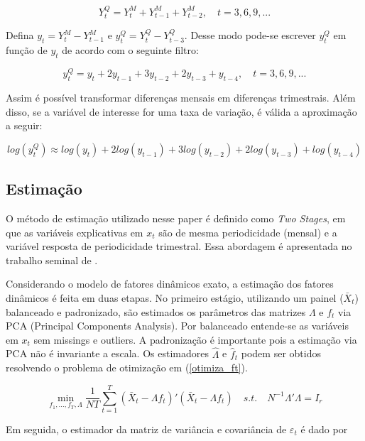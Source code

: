 \documentclass{article}
\begin{document}
\begin{equation}
Y_t^Q = Y_t^M + Y_{t-1}^M + Y_{t-2}^M, \quad  t = 3,6,9,...
\end{equation}

Defina $y_t = Y_t^M - Y_{t-1}^M$ e $y_t^Q = Y_t^Q - Y_{t-3}^Q$. Desse modo pode-se escrever $y_t^Q$ em função de $y_t$ de acordo com o seguinte filtro:

\begin{equation}
y_t^Q = y_t + 2y_{t-1} + 3y_{t-2} + 2y_{t-3} + y_{t-4}, \quad  t = 3,6,9,...
\end{equation}

Assim é possível transformar diferenças mensais em diferenças trimestrais. Além disso, se a variável de interesse for uma taxa de variação, é válida a aproximação a seguir:

\begin{equation}
log(y_t^Q) \approx log(y_t) + 2log(y_{t-1}) + 3log(y_{t-2}) + 2log(y_{t-3}) + log(y_{t-4})
\end{equation}

\subsection{Estimação}\label{estima}

O método de estimação utilizado nesse paper é definido como \textit{Two Stages}, em que as variáveis explicativas em $x_t$ são de mesma periodicidade (mensal) e a variável resposta de periodicidade trimestral. Essa abordagem é apresentada no trabalho seminal de \cite{giannoneetal2008}. 

Considerando o modelo de fatores dinâmicos exato, a estimação dos fatores dinâmicos é feita em duas etapas. No primeiro estágio, utilizando um painel ($\bar{X}_t$) balanceado e padronizado, são estimados os parâmetros das matrizes $\Lambda$ e $f_t$ via PCA (Principal Components Analysis). Por balanceado entende-se as variáveis em $x_t$ sem missings e outliers. A padronização é importante pois a estimação via PCA não é invariante a escala. Os estimadores $\hat\Lambda$ e $\hat{f}_t$ podem ser obtidos resolvendo o problema de otimização em (\ref{otimiza_ft}).

\begin{equation}\label{otimiza_ft}
\min_{f_1,...,f_T,\Lambda} \frac{1}{NT} \sum_{t=1}^T (\bar{X}_t -\Lambda f_t)'(\bar{X}_t -\Lambda f_t) \quad s.t. \quad N^{-1} \Lambda'\Lambda = I_r
\end{equation}

Em seguida, o estimador da matriz de variância e covariância de $\varepsilon_t$ é dado por
\end{document}

